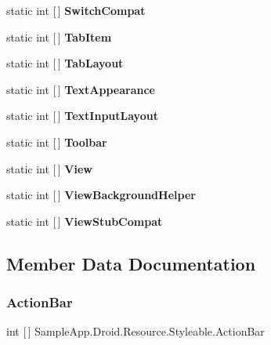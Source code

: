 \begin{DoxyCompactItemize}
static int \mbox{[}$\,$\mbox{]} {\bfseries Switch\+Compat}
\item 
static int \mbox{[}$\,$\mbox{]} {\bfseries Tab\+Item}
\item 
static int \mbox{[}$\,$\mbox{]} {\bfseries Tab\+Layout}
\item 
static int \mbox{[}$\,$\mbox{]} {\bfseries Text\+Appearance}
\item 
static int \mbox{[}$\,$\mbox{]} {\bfseries Text\+Input\+Layout}
\item 
static int \mbox{[}$\,$\mbox{]} {\bfseries Toolbar}
\item 
static int \mbox{[}$\,$\mbox{]} {\bfseries View}
\item 
static int \mbox{[}$\,$\mbox{]} {\bfseries View\+Background\+Helper}
\item 
static int \mbox{[}$\,$\mbox{]} {\bfseries View\+Stub\+Compat}
\end{DoxyCompactItemize}


\subsection{Member Data Documentation}
\mbox{\label{class_sample_app_1_1_droid_1_1_resource_1_1_styleable_a3c26f0185d7d746a6fa28e98eb32a815}} 
\subsubsection{\texorpdfstring{Action\+Bar}{ActionBar}}
{\footnotesize\ttfamily int \mbox{[}$\,$\mbox{]} Sample\+App.\+Droid.\+Resource.\+Styleable.\+Action\+Bar\hspace{0.3cm}{\ttfamily [static]}}

